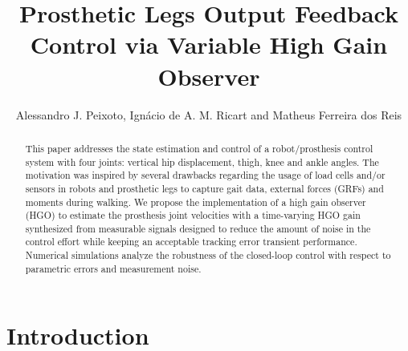 \documentclass[letterpaper, 10 pt, conference]{ieeeconf}  %
\title{\LARGE \bf
Prosthetic Legs Output Feedback Control via Variable High Gain Observer}
\author{Alessandro J. Peixoto, %
        Ign\'{a}cio de A. M. Ricart and
        Matheus Ferreira dos Reis %
}
\theoremstyle{plain}
\theoremstyle{definition}
\theoremstyle{remark}
\begin{document}

\maketitle
\thispagestyle{empty}
\pagestyle{empty}
\begin{abstract}%
This paper addresses the state estimation and control of a robot/prosthesis control system with four joints: vertical hip displacement, thigh, knee and ankle angles. The motivation was inspired by several drawbacks regarding the usage of load cells and/or sensors in robots and prosthetic legs to capture gait data, external forces (GRFs) and moments during walking. We propose the implementation of a high gain observer (HGO)  to estimate the  prosthesis joint velocities with a time-varying HGO gain synthesized from measurable signals designed to reduce the amount of noise in the control effort while keeping an acceptable tracking error transient performance. Numerical simulations analyze the robustness of the closed-loop control with respect
to parametric errors and measurement noise.
\end{abstract}
\section{Introduction}


\end{document}
